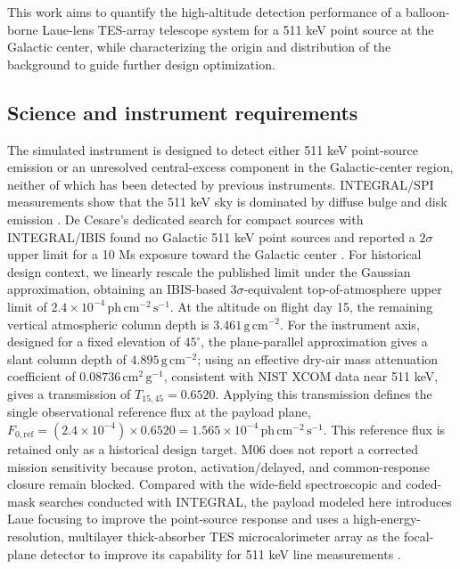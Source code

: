 \documentclass[11pt]{article}
\newcommand{\phcms}{\ensuremath{\,\mathrm{ph\,cm^{-2}\,s^{-1}}}}
\begin{document}
This work aims to quantify the high-altitude detection performance of a
balloon-borne Laue-lens TES-array telescope system for a 511 keV point source at
the Galactic center, while characterizing the origin and distribution of the
background to guide further design optimization.

\subsection{Science and instrument requirements}
\label{sec:requirements}

\begingroup
{}

The simulated instrument is designed to detect either 511 keV point-source
emission or an unresolved central-excess component in the Galactic-center
region, neither of which has been detected by previous instruments.
INTEGRAL/SPI measurements show that the 511 keV sky is dominated by diffuse
bulge and disk emission \cite{Siegert2016AA,Yoneda2025}. De Cesare's dedicated
search for compact sources with INTEGRAL/IBIS found no Galactic 511 keV point
sources and reported a $2\sigma$ upper limit for a 10 Ms exposure toward the
Galactic center \cite{DeCesare2011}. For historical design context, we linearly
rescale the published limit under the Gaussian approximation, obtaining an
IBIS-based $3\sigma$-equivalent
top-of-atmosphere upper limit of $2.4\times10^{-4}\phcms$. At the altitude on
flight day 15, the remaining vertical atmospheric column depth is
$3.461\,\mathrm{g\,cm^{-2}}$. For the instrument axis, designed for a fixed
elevation of $45^\circ$, the plane-parallel approximation gives a slant column
depth of $4.895\,\mathrm{g\,cm^{-2}}$; using an effective dry-air mass
attenuation coefficient of $0.08736\,\mathrm{cm^2\,g^{-1}}$, consistent with NIST
XCOM data near 511 keV, gives a transmission of $T_{15,45}=0.6520$. Applying
this transmission defines the single observational reference flux at the
payload plane,
$F_{0,\mathrm{ref}}=(2.4\times10^{-4})\times0.6520=1.565\times10^{-4}\phcms$.
This reference flux is retained only as a historical design target. M06 does
not report a corrected mission sensitivity because proton, activation/delayed,
and common-response closure remain blocked. Compared with the wide-field spectroscopic and
coded-mask searches conducted with INTEGRAL, the payload modeled here
introduces Laue focusing to improve the point-source response and uses a
high-energy-resolution, multilayer thick-absorber TES microcalorimeter array as
the focal-plane detector to improve its capability for 511 keV line
measurements \cite{Shirazi2023,Caputo2017}.
\end{document}
